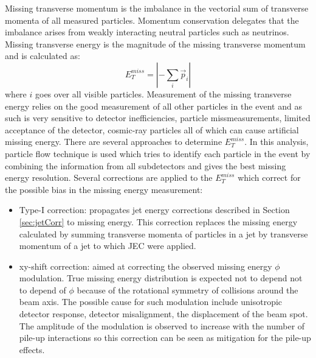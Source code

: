 Missing transverse momentum is the imbalance in the vectorial sum of transverse momenta of all measured particles. Momentum conservation delegates that the imbalance arises from weakly interacting neutral particles such as neutrinos. Missing transverse energy is the magnitude of the missing transverse momentum and is calculated as:
\begin{equation}
E_T^{miss}= |-\sum_{i} \vec{p}_i|
\end{equation}
where $i$ goes over all visible particles. Measurement of the missing transverse energy relies on the good measurement of all other particles in the event and as such is very sensitive to detector inefficiencies, particle missmeasurements, limited acceptance of the detector, cosmic-ray particles all of which can cause artificial missing energy. There are several approaches to determine $E_T^{miss}$. In this analysis, particle flow technique is used which tries to identify each particle in the event by combining the information from all subdetectors and gives the best missing energy resolution.\cite{CMS-PAS-PFT-09-001,Chatrchyan:2011tn} Several corrections are applied to the $E_T^{miss}$ which correct for the possible bias in the missing energy measurement:
\begin{itemize}
\item Type-I correction: propagates jet energy corrections described in Section \ref{sec:jetCorr} to missing energy. This correction replaces the missing energy calculated by summing transverse momenta of particles in a jet by transverse momentum of a jet to which JEC were applied.
\item xy-shift correction: aimed at correcting the observed missing energy $\phi$ modulation. True missing energy distribution is expected not to depend not to depend of $\phi$ because of the rotational symmetry of collisions around the beam axis. The possible cause for such modulation  include unisotropic detector response, detector misalignment, the displacement of the beam spot. The amplitude of the modulation is observed to increase with the number of pile-up interactions so this correction can be seen as mitigation for the pile-up effects.
\end{itemize}




